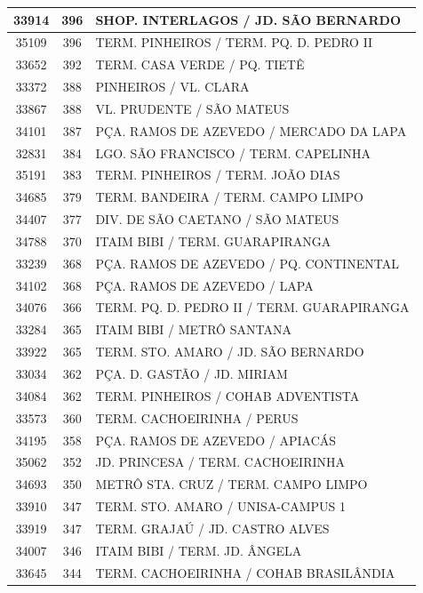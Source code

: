 \documentclass[
	12pt,				%
	oneside,			%
	a4paper,			%
	english,			%
	brazil				%
	]{abntex2ppgsi}
\begin{document}
\begin{apendicesenv}
\begin{longtable}{c|c|p{7cm}}
\hline
    33914 & 396   & SHOP. INTERLAGOS / JD. SÃO BERNARDO \\
\hline
    35109 & 396   & TERM. PINHEIROS / TERM. PQ. D. PEDRO II \\
\hline
    33652 & 392   & TERM. CASA VERDE / PQ. TIETÊ \\
\hline
    33372 & 388   & PINHEIROS / VL. CLARA \\
\hline
    33867 & 388   & VL. PRUDENTE / SÃO MATEUS \\
\hline
    34101 & 387   & PÇA. RAMOS DE AZEVEDO / MERCADO DA LAPA \\
\hline
    32831 & 384   & LGO. SÃO FRANCISCO / TERM. CAPELINHA \\
\hline
    35191 & 383   & TERM. PINHEIROS / TERM. JOÃO DIAS \\
\hline
    34685 & 379   & TERM. BANDEIRA / TERM. CAMPO LIMPO \\
\hline
    34407 & 377   & DIV. DE SÃO CAETANO / SÃO MATEUS \\
\hline
    34788 & 370   & ITAIM BIBI / TERM. GUARAPIRANGA \\
\hline
    33239 & 368   & PÇA. RAMOS DE AZEVEDO / PQ. CONTINENTAL \\
\hline
    34102 & 368   & PÇA. RAMOS DE AZEVEDO / LAPA \\
\hline
    34076 & 366   & TERM. PQ. D. PEDRO II / TERM. GUARAPIRANGA \\
\hline
    33284 & 365   & ITAIM BIBI / METRÔ SANTANA \\
\hline
    33922 & 365   & TERM. STO. AMARO / JD. SÃO BERNARDO \\
\hline
    33034 & 362   & PÇA. D. GASTÃO / JD. MIRIAM \\
\hline
    34084 & 362   & TERM. PINHEIROS / COHAB ADVENTISTA \\
\hline
    33573 & 360   & TERM. CACHOEIRINHA / PERUS \\
\hline
    34195 & 358   & PÇA. RAMOS DE AZEVEDO / APIACÁS \\
\hline
    35062 & 352   & JD. PRINCESA / TERM. CACHOEIRINHA \\
\hline
    34693 & 350   & METRÔ STA. CRUZ / TERM. CAMPO LIMPO \\
\hline
    33910 & 347   & TERM. STO. AMARO / UNISA-CAMPUS 1 \\
\hline
    33919 & 347   & TERM. GRAJAÚ / JD. CASTRO ALVES \\
\hline
    34007 & 346   & ITAIM BIBI / TERM. JD. ÂNGELA \\
\hline
    33645 & 344   & TERM. CACHOEIRINHA / COHAB BRASILÂNDIA \\

\end{longtable}
\end{apendicesenv}
\end{document}
